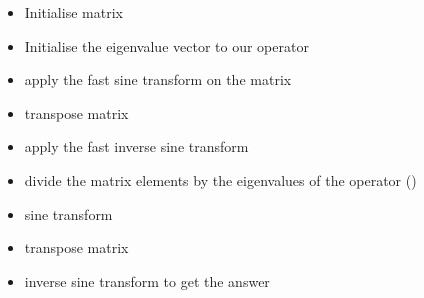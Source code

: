 \begin{itemize}
\item Initialise matrix
\item Initialise the eigenvalue vector to our operator
\item apply the fast sine transform on the matrix
\item transpose matrix
\item apply the fast inverse sine transform
\item divide the matrix elements by the eigenvalues of the operator ()
\item sine transform
\item transpose matrix
\item inverse sine transform to get the answer
\end{itemize}
